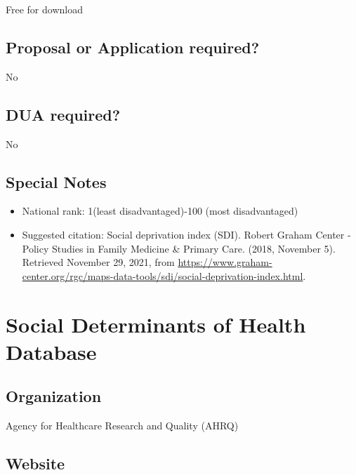 \documentclass[
]{book}
\providecommand{\tightlist}{%
  \setlength{\itemsep}{0pt}\setlength{\parskip}{0pt}}
\begin{document}
Free for download

\hypertarget{proposal-or-application-required-79}{%
\section{Proposal or Application required?}\label{proposal-or-application-required-79}}

No

\hypertarget{dua-required-79}{%
\section{DUA required?}\label{dua-required-79}}

No

\hypertarget{special-notes-79}{%
\section{Special Notes}\label{special-notes-79}}

\begin{itemize}
\tightlist
\item
  National rank: 1(least disadvantaged)-100 (most disadvantaged)
\item
  Suggested citation: Social deprivation index (SDI). Robert Graham Center - Policy Studies in Family Medicine \& Primary Care. (2018, November 5). Retrieved November 29, 2021, from \url{https://www.graham-center.org/rgc/maps-data-tools/sdi/social-deprivation-index.html}.
\end{itemize}

\mainmatter

\hypertarget{social-determinants-of-health-database}{%
\chapter{Social Determinants of Health Database}\label{social-determinants-of-health-database}}

\hypertarget{organization-80}{%
\section{Organization}\label{organization-80}}

Agency for Healthcare Research and Quality (AHRQ)

\hypertarget{website-80}{%
\section{Website}\label{website-80}}
\end{document}
